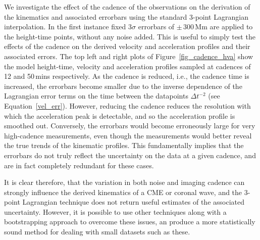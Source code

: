 \documentclass[structabstract]{aa}
\begin{document}
We investigate the effect of the cadence of the observations on the derivation of the kinematics and associated errorbars using the standard 3-point Lagrangian interpolation. In the first instance fixed 3$\sigma$ errorbars of $\pm$\,300\,Mm are applied to the height-time points, without any noise added. This is useful to simply test the effects of the cadence on the derived velocity and acceleration profiles and their associated errors. The top left and right plots of Figure~\ref{fig_cadence_hva} show the model height-time, velocity and acceleration profiles sampled at cadences of 12 and 50\,mins respectively. As the cadence is reduced, i.e., the cadence time is increased, the errorbars become smaller due to the inverse dependence of the Lagrangian error terms on the time between the datapoints $\Delta t^{-2}$ (see Equation~\ref{vel_err}). However, reducing the cadence reduces the resolution with which the acceleration peak is detectable, and so the acceleration profile is smoothed out. Conversely, the errorbars would become erroneously large for very high-cadence measurements, even though the measurements would better reveal the true trends of the kinematic profiles. This fundamentally implies that the errorbars do not truly reflect the uncertainty on the data at a given cadence, and are in fact completely redundant for these cases.




It is clear therefore, that the variation in both noise and imaging cadence can strongly influence the derived kinematics of a CME or coronal wave, and the 3-point Lagrangian technique does not return useful estimates of the associated uncertainty. However, it is possible to use other techniques along with a bootstrapping approach to overcome these issues, an produce a more statistically sound method for dealing with small datasets such as these. 
\end{document}
